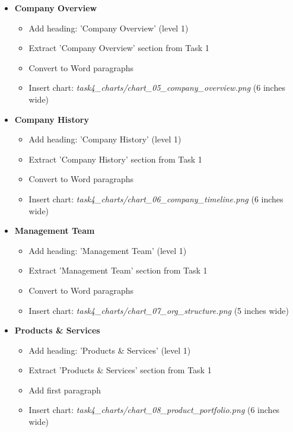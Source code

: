 \documentclass[11pt]{article}
\begin{document}
\begin{itemize}[leftmargin=*,itemsep=2pt,topsep=2pt]
\item {} \textbf{Company Overview}
\begin{itemize}[leftmargin=*,itemsep=2pt,topsep=2pt]
\item {} Add heading: 'Company Overview' (level 1)
\item {} Extract 'Company Overview' section from Task 1
\item {} Convert to Word paragraphs
\item {} Insert chart: \emph{task4\_\allowbreak{}charts/chart\_\allowbreak{}05\_\allowbreak{}company\_\allowbreak{}overview.png} (6 inches wide)
\end{itemize}
\item {} \textbf{Company History}
\begin{itemize}[leftmargin=*,itemsep=2pt,topsep=2pt]
\item {} Add heading: 'Company History' (level 1)
\item {} Extract 'Company History' section from Task 1
\item {} Convert to Word paragraphs
\item {} Insert chart: \emph{task4\_\allowbreak{}charts/chart\_\allowbreak{}06\_\allowbreak{}company\_\allowbreak{}timeline.png} (6 inches wide)
\end{itemize}
\item {} \textbf{Management Team}
\begin{itemize}[leftmargin=*,itemsep=2pt,topsep=2pt]
\item {} Add heading: 'Management Team' (level 1)
\item {} Extract 'Management Team' section from Task 1
\item {} Convert to Word paragraphs
\item {} Insert chart: \emph{task4\_\allowbreak{}charts/chart\_\allowbreak{}07\_\allowbreak{}org\_\allowbreak{}structure.png} (5 inches wide)
\end{itemize}
\item {} \textbf{Products \& Services}
\begin{itemize}[leftmargin=*,itemsep=2pt,topsep=2pt]
\item {} Add heading: 'Products \& Services' (level 1)
\item {} Extract 'Products \& Services' section from Task 1
\item {} Add first paragraph
\item {} Insert chart: \emph{task4\_\allowbreak{}charts/chart\_\allowbreak{}08\_\allowbreak{}product\_\allowbreak{}portfolio.png} (6 inches wide)

\end{itemize}
\end{itemize}
\end{document}
